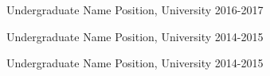 


\begin{cvhonors}

  \cvhonor
    {Undergraduate Name} %
    {Position, University} %
    {} %
    {2016-2017} %

  \cvhonor
    {Undergraduate Name} %
    {Position, University} %
    {} %
    {2014-2015} %

  \cvhonor
    {Undergraduate Name} %
    {Position, University} %
    {} %
    {2014-2015} %

\end{cvhonors}
